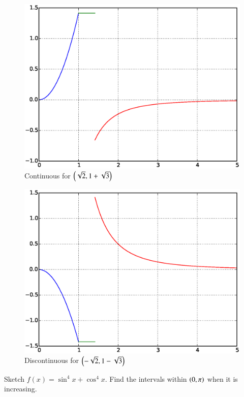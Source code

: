 \documentclass[journal,12pt,twocolumn]{IEEEtran}
\begin{document}
\begin{figure}[h]
\centering
\includegraphics[width=\columnwidth]{./figs/ee16b1019c}
\caption{ Continuous for $\left(\sqrt{2}, 1 + \sqrt{3}\right)$}
\end{figure}
%
\begin{figure}[h]
\centering
\includegraphics[width=\columnwidth]{./figs/ee16b1019d}
\caption{ Discontinuous for $\left(-\sqrt{2}, 1 - \sqrt{3}\right)$}
\end{figure}
%
\renewcommand{\thefigure}{\theproblem}
\begin{problem}
Sketch $f(x) = \sin^4x + \cos^4x$. Find the intervals within $\left(0,\pi\right)$ when it is increasing.
\end{problem}
\end{document}
